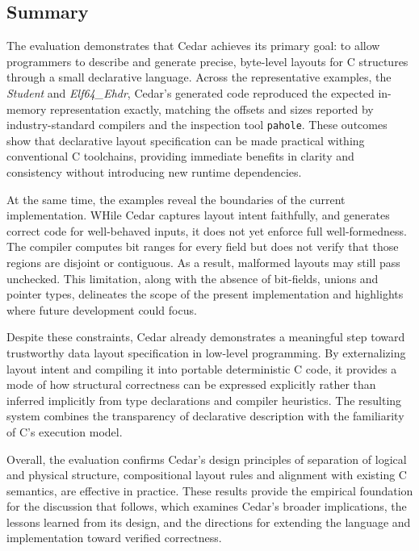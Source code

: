 \subsection{Summary}
The evaluation demonstrates that Cedar achieves its primary goal:
to allow programmers to describe and generate precise, byte-level
layouts for C structures through a small declarative language.
Across the representative examples, the \textit{Student} and \textit{Elf64\_Ehdr},
Cedar's generated code reproduced the expected in-memory
representation exactly, matching the offsets and sizes reported by
industry-standard compilers and the inspection tool \texttt{pahole}.
These outcomes show that declarative layout specification can be made
practical withing conventional C toolchains, providing
immediate benefits in clarity and consistency without introducing
new runtime dependencies.

At the same time, the examples reveal the boundaries of the current
implementation. WHile Cedar captures layout intent faithfully, and generates
correct code for well-behaved inputs, it does not yet enforce full
well-formedness. The compiler computes bit ranges for every field but
does not verify that those regions are disjoint or contiguous.
As a result, malformed layouts may still pass unchecked. This
limitation, along with the absence of bit-fields, unions
and pointer types, delineates the scope of the
present implementation and highlights where future development could focus.

Despite these constraints, Cedar already demonstrates a
meaningful step toward trustworthy data layout specification
in low-level programming. By externalizing layout intent and compiling
it into portable deterministic C code, it provides a mode of how
structural correctness can be expressed explicitly
rather than inferred implicitly from type declarations
and compiler heuristics. The resulting system
combines the transparency of declarative description with the familiarity
of C's execution model.

Overall, the evaluation confirms Cedar's design principles of separation of logical
and physical structure, compositional layout rules and alignment with existing
C semantics, are effective in practice. These results provide the empirical
foundation for the discussion that follows, which examines Cedar's broader
implications, the lessons learned from its design, and the directions
for extending the language and implementation toward verified correctness.